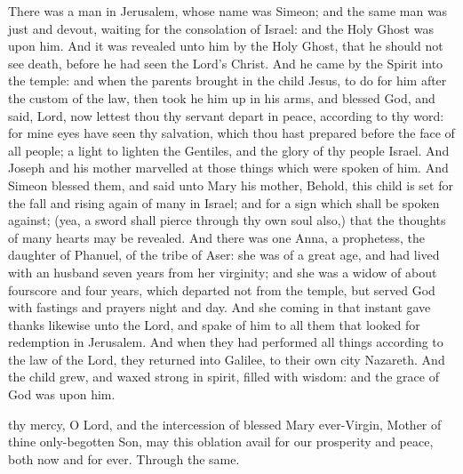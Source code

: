 
 There was a man in Jerusalem, whose name was Simeon; and the same man was just and devout, waiting for the consolation of Israel: and the Holy Ghost was upon him. And it was revealed unto him by the Holy Ghost, that he should not see death, before he had seen the Lord’s Christ. And he came by the Spirit into the temple: and when the parents brought in the child Jesus, to do for him after the custom of the law, then took he him up in his arms, and blessed God, and said, Lord, now lettest thou thy servant depart in peace, according to thy word: for mine eyes have seen thy salvation, which thou hast prepared before the face of all people; a light to lighten the Gentiles, and the glory of thy people Israel. And Joseph and his mother marvelled at those things which were spoken of him. And Simeon blessed them, and said unto Mary his mother, Behold, this child is set for the fall and rising again of many in Israel; and for a sign which shall be spoken against; (yea, a sword shall pierce through thy own soul also,) that the thoughts of many hearts may be revealed. And there was one Anna, a prophetess, the daughter of Phanuel, of the tribe of Aser: she was of a great age, and had lived with an husband seven years from her virginity; and she was a widow of about fourscore and four years, which departed not from the temple, but served God with fastings and prayers night and day. And she coming in that instant gave thanks likewise unto the Lord, and spake of him to all them that looked for redemption in Jerusalem. And when they had performed all things according to the law of the Lord, they returned into Galilee, to their own city Nazareth. And the child grew, and waxed strong in spirit, filled with wisdom: and the grace of God was upon him.


\secret
{} thy mercy, O Lord, and the intercession of blessed Mary ever-Virgin, Mother of thine only-begotten Son, may this oblation avail for our prosperity and peace, both now and for ever. Through the same.

